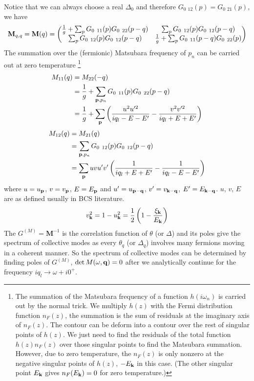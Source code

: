 Notice that we can always choose a real $\Delta_{0}$ and therefore $G_{0}{\ _{12}}(p)=G_{0}{\ _{21}}(p)$, we have 
\begin{equation}
\mathbf{M}_{q,q}=\mathbf{M}(q)=
\begin{pmatrix}
\nth{g}+\sum_{p}G_{0}{\ }_{11}(p)G_{0}{\ }_{22}(p-q)&\sum_{p}G_{0}{\ }_{12}(p)G_{0}{\ }_{12}(p-q)\\
\sum_{p}G_{0}{\ }_{12}(p)G_{0}{\ }_{12}(p-q)&\nth{g}+\sum_{p}G_{0}{\ }_{11}(p-q)G_{0}{\ }_{22}(p)
\end{pmatrix}
\end{equation}
The summation over  the (fermionic) Matsubara frequency of $p_{n}$ can be carried out at zero temperature
\footnote{\label{foot:intro:sum}The summation of the Matsubara frequency of a function $h(i\omega_{n})$ is carried out by the normal trick.  We  multiply $h(z)$ with the Fermi distribution function $n_{F}(z)$,  the summation is the sum of residuals at the imaginary axis of $n_{F}(z)$.  The contour can be deform into a contour over the rest of singular points of $h(z)$. We just need to find the residuals of the total function $h(z)n_{F}(z)$ over those singular points to find the Matsubara summation.   However, due to zero temperature, the  $n_{F}(z)$ is only nonzero at the negative singular points of $h(z)$, $-E_{\mathbf{k}}$ in this case.  (The other singular point $E_{\mathbf{k}}$ gives $n_{F}(E_{\mathbf{k}})=0$ for zero temperature.)}
\begin{equation}
\begin{split}
M_{11}(q)&=M_{22}(-q)\\
	&=\nth{g}+\sum_{\vp{,}p_{n}}G_{0}{\ }_{11}(p)G_{0}{\ }_{22}(p-q)\\
	&=\nth{g}+\sum_{\vp}\br{\frac{u^{2}u'^{2}}{iq_{l}-E-E'}-\frac{v^{2}v'^{2}}{iq_{l}+E+E'}}
\end{split}
\end{equation}
\begin{equation}
\begin{split}
M_{12}(q)&=M_{21}(q)\\
	&=\sum_{\mathbf{p}{,}p_{n}}G_{0}{\ }_{12}(p)G_{0}{\ }_{12}(p-q)\\
	&=\sum_{\mathbf{p}}uvu'v'\left(\frac{1}{iq_{l}+E+E'}-\frac{1}{iq_{l}-E-E'}\right)
\end{split}
\end{equation}
where $u=u_{\mathbf{p}}$, $v=v_{\mathbf{p}}$, $E=E_{\mathbf{p}}$ and $u'=u_{\mathbf{p}-\mathbf{q}}$, $v'=v_{\mathbf{k}-\mathbf{q}}$, $E'=E_{\mathbf{k}-\mathbf{q}}$.  $u$, $v$, $E$ are as defined usually in BCS literature. 
\begin{equation}
v_{\mathbf{k}}^{2}=1-u_{\mathbf{k}}^{2}=\frac{1}{2}\left(1-\frac{\xi_{\mathbf{k}}}{E_{\mathbf{k}}}\right)
\end{equation}
 The $G^{(M)}=\mathbf{M}^{-1}$ is the correlation function of $\theta$ (or $\Delta$) and its poles give the spectrum of collective modes as every  $\theta_{q}$ (or $\Delta_{q}$) involves many fermions moving in a coherent manner.  So the spectrum of collective modes can be determined by finding poles of $G^{(M)}$, $\det{M(\omega,\ensuremath{\mathbf{q}})}=0$ after we analytically continue for the frequency $iq_{l}\rightarrow\omega+i0^{+}$.  
 
